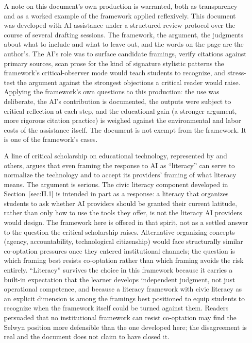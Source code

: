 \documentclass[12pt]{article}
\begin{document}
A note on this document's own production is warranted, both as transparency and as a worked example of the framework applied reflexively. This document was developed with AI assistance under a structured review protocol over the course of several drafting sessions. The framework, the argument, the judgments about what to include and what to leave out, and the words on the page are the author's. The AI's role was to surface candidate framings, verify citations against primary sources, scan prose for the kind of signature stylistic patterns the framework's critical-observer mode would teach students to recognize, and stress-test the argument against the strongest objections a critical reader would raise. Applying the framework's own questions to this production: the use was deliberate, the AI's contribution is documented, the outputs were subject to critical reflection at each step, and the educational gain (a stronger argument, more rigorous citation practice) is weighed against the environmental and labor costs of the assistance itself. The document is not exempt from the framework. It is one of the framework's cases.

A line of critical scholarship on educational technology, represented by \textcite{selwyn2024limits} and others, argues that even framing the response to AI as ``literacy'' can serve to normalize the technology and to accept its providers' framing of what literacy means. The argument is serious. The civic literacy component developed in Section~\ref{sec:II.1} is intended in part as a response: a literacy that organizes students to ask whether AI providers should be granted their current latitude, rather than only how to use the tools they offer, is not the literacy AI providers would design. The framework here is offered in that spirit, not as a settled answer to the question the critical scholarship raises. Alternative organizing concepts (agency, accountability, technological citizenship) would face structurally similar co-optation pressures once they entered institutional channels; the question is which framing best resists co-optation rather than which framing avoids the risk entirely. ``Literacy'' survives the choice in this framework because it carries a built-in expectation that the learner develops independent judgment, not just operational competence, and because a literacy framework with civic literacy as an explicit dimension is among the framings best positioned to equip students to recognize when the framework itself could be turned against them. Readers persuaded that no institutional framework can resist co-optation may find the Selwyn position more defensible than the one developed here; the disagreement is real and the document does not claim to have closed it.
\end{document}

